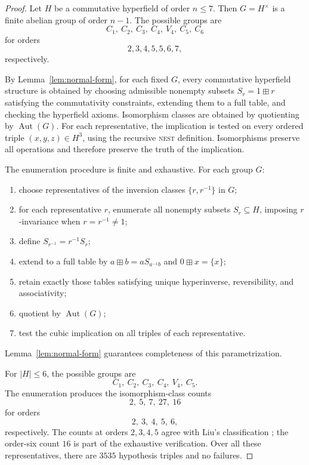 \documentclass[12pt]{article}
\theoremstyle{definition}
\theoremstyle{remark}
\numberwithin{equation}{section}
\begin{document}
\begin{proof}
Let \(H\) be a commutative hyperfield of order \(n\le7\). Then \(G=H^\times\) is a finite abelian group of order \(n-1\). The possible groups are
\[
C_1,\ C_2,\ C_3,\ C_4,\ V_4,\ C_5,\ C_6
\]
for orders
\[
2,3,4,5,5,6,7,
\]
respectively.

By Lemma~\ref{lem:normal-form}, for each fixed \(G\), every commutative hyperfield structure is obtained by choosing admissible nonempty subsets \(S_r=1\boxplus r\) satisfying the commutativity constraints, extending them to a full table, and checking the hyperfield axioms. Isomorphism classes are obtained by quotienting by \(\operatorname{Aut}(G)\). For each representative, the implication is tested on every ordered triple \((x,y,z)\in H^3\), using the recursive \textsc{nest} definition. Isomorphisms preserve all operations and therefore preserve the truth of the implication.

The enumeration procedure is finite and exhaustive. For each group \(G\):
\begin{enumerate}
\item choose representatives of the inversion classes \(\{r,r^{-1}\}\) in \(G\);
\item for each representative \(r\), enumerate all nonempty subsets \(S_r\subseteq H\), imposing \(r\)-invariance when \(r=r^{-1}\neq1\);
\item define \(S_{r^{-1}}=r^{-1}S_r\);
\item extend to a full table by \(a\boxplus b=aS_{a^{-1}b}\) and \(0\boxplus x=\{x\}\);
\item retain exactly those tables satisfying unique hyperinverse, reversibility, and associativity;
\item quotient by \(\operatorname{Aut}(G)\);
\item test the cubic implication on all triples of each representative.
\end{enumerate}
Lemma~\ref{lem:normal-form} guarantees completeness of this parametrization.

For \(|H|\le6\), the possible groups are
\[
C_1,\ C_2,\ C_3,\ C_4,\ V_4,\ C_5.
\]
The enumeration produces the isomorphism-class counts
\[
2,\ 5,\ 7,\ 27,\ 16
\]
for orders
\[
2,\ 3,\ 4,\ 5,\ 6,
\]
respectively. The counts at orders \(2,3,4,5\) agree with Liu's classification \cite{Liu}; the order-six count \(16\) is part of the exhaustive verification. Over all these representatives, there are \(3535\) hypothesis triples and no failures.


\end{proof}
\end{document}
